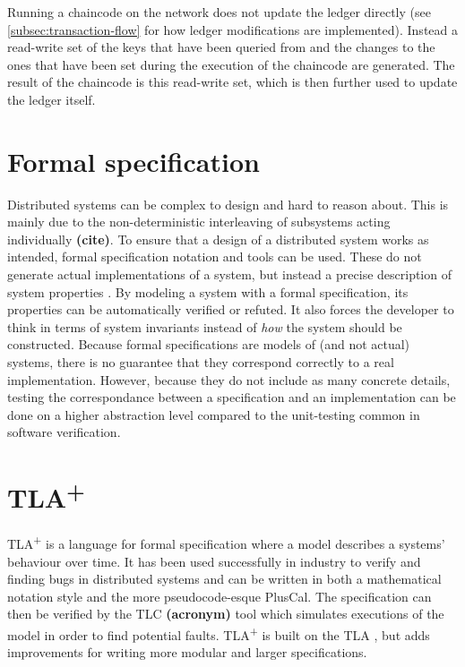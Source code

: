 \documentclass[english, biblatex, digitaloutput]{kththesis}
\begin{document}
Running a chaincode on the network does not update the ledger directly (see \ref{subsec:transaction-flow} for how ledger modifications are implemented). Instead a read-write set of the keys that have been queried from and the changes to the ones that have been set during the execution of the chaincode are generated. The result of the chaincode is this read-write set, which is then further used to update the ledger itself.




\section{Formal specification}

Distributed systems can be complex to design and hard to reason about. This is mainly due to the non-deterministic interleaving of subsystems acting individually \textbf{(cite)}. To ensure that a design of a distributed system works as intended, formal specification notation and tools can be used. These do not generate actual implementations of a system, but instead a precise description of system properties \cite{lamsweerde_formal_2000}. By modeling a system with a formal specification, its properties can be automatically verified or refuted. It also forces the developer to think in terms of system invariants instead of \textit{how} the system should be constructed. Because formal specifications are models of (and not actual) systems, there is no guarantee that they correspond correctly to a real implementation. However, because they do not include as many concrete details, testing the correspondance between a specification and an implementation can be done on a higher abstraction level compared to the unit-testing common in software verification.


\section{TLA\textsuperscript+}

TLA\textsuperscript+ \cite{lamport_specifying_2001} is a language for formal specification where a model describes a systems' behaviour over time. It has been used successfully in industry to verify and finding bugs in distributed systems \cite{joshi_checking_2003,newcombe_how_2015} and can be written in both a mathematical notation style and the more pseudocode-esque PlusCal. The specification can then be verified by the TLC \textbf{(acronym)} tool which simulates executions of the model in order to find potential faults. TLA\textsuperscript+ is built on the \gls{TLA} \cite{lamport_temporal_1994}, but adds improvements for writing more modular and larger specifications.
\end{document}
